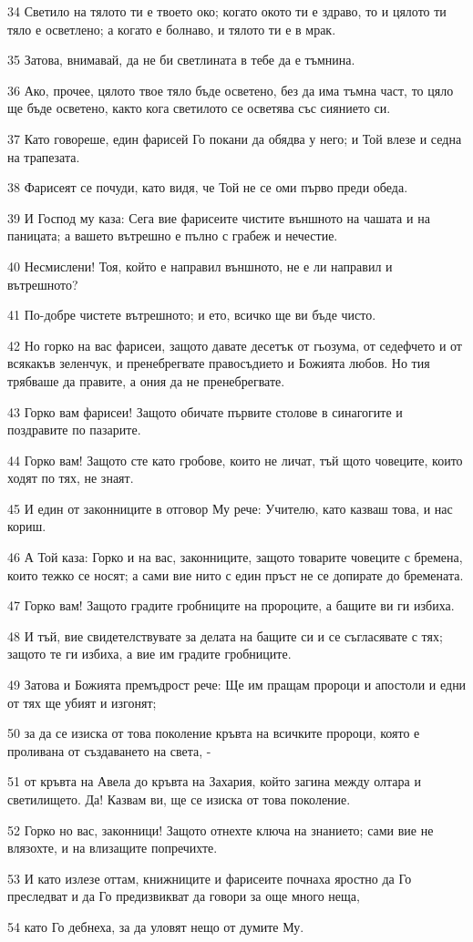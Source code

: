 \par 34 Светило на тялото ти е твоето око; когато окото ти е здраво, то и цялото ти тяло е осветлено; а когато е болнаво, и тялото ти е в мрак.
\par 35 Затова, внимавай, да не би светлината в тебе да е тъмнина.
\par 36 Ако, прочее, цялото твое тяло бъде осветено, без да има тъмна част, то цяло ще бъде осветено, както кога светилото се осветява със сиянието си.
\par 37 Като говореше, един фарисей Го покани да обядва у него; и Той влезе и седна на трапезата.
\par 38 Фарисеят се почуди, като видя, че Той не се оми първо преди обеда.
\par 39 И Господ му каза: Сега вие фарисеите чистите външното на чашата и на паницата; а вашето вътрешно е пълно с грабеж и нечестие.
\par 40 Несмислени! Тоя, който е направил външното, не е ли направил и вътрешното?
\par 41 По-добре чистете вътрешното; и ето, всичко ще ви бъде чисто.
\par 42 Но горко на вас фарисеи, защото давате десетък от гьозума, от седефчето и от всякакъв зеленчук, и пренебрегвате правосъдието и Божията любов. Но тия трябваше да правите, а ония да не пренебрегвате.
\par 43 Горко вам фарисеи! Защото обичате първите столове в синагогите и поздравите по пазарите.
\par 44 Горко вам! Защото сте като гробове, които не личат, тъй щото човеците, които ходят по тях, не знаят.
\par 45 И един от законниците в отговор Му рече: Учителю, като казваш това, и нас кориш.
\par 46 А Той каза: Горко и на вас, законниците, защото товарите човеците с бремена, които тежко се носят; а сами вие нито с един пръст не се допирате до бремената.
\par 47 Горко вам! Защото градите гробниците на пророците, а бащите ви ги избиха.
\par 48 И тъй, вие свидетелствувате за делата на бащите си и се съгласявате с тях; защото те ги избиха, а вие им градите гробниците.
\par 49 Затова и Божията премъдрост рече: Ще им пращам пророци и апостоли и едни от тях ще убият и изгонят;
\par 50 за да се изиска от това поколение кръвта на всичките пророци, която е проливана от създаването на света, -
\par 51 от кръвта на Авела до кръвта на Захария, който загина между олтара и светилището. Да! Казвам ви, ще се изиска от това поколение.
\par 52 Горко но вас, законници! Защото отнехте ключа на знанието; сами вие не влязохте, и на влизащите попречихте.
\par 53 И като излезе оттам, книжниците и фарисеите почнаха яростно да Го преследват и да Го предизвикват да говори за още много неща,
\par 54 като Го дебнеха, за да уловят нещо от думите Му.

